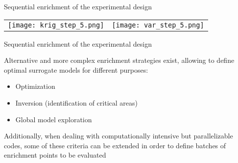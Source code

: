 \documentclass[9pt]{beamer}
\begin{document}

\begin{frame}{Sequential enrichment of the experimental design}

\begin{tabular}{cc}
\texttt{[image: krig\_step\_5.png]}&
\texttt{[image: var\_step\_5.png]}
\end{tabular}


\end{frame}


\begin{frame}{Sequential enrichment of the experimental design}

Alternative and more complex enrichment strategies exist, allowing to define optimal surrogate models for different purposes:

\begin{itemize}
\item Optimization
\item Inversion (identification of critical areas)
\item Global model exploration 
\end{itemize}

\vspace{10pt}

Additionally, when dealing with computationally intensive but parallelizable codes, some of these criteria can be extended in order to define batches of enrichment points to be evaluated


\end{frame}

\end{document}
